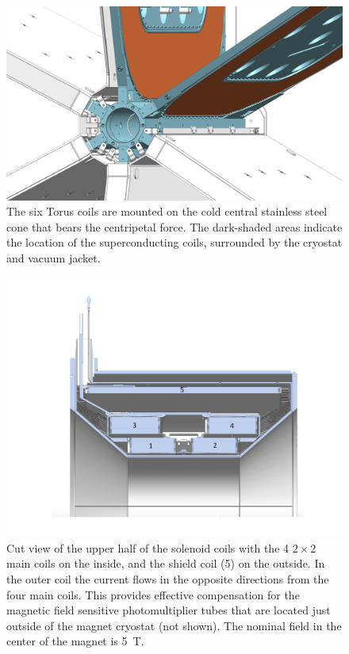 \documentclass[final,3p,twocolumn]{elsarticle}
\begin{document}
\begin{figure}[htbp!]
\centerline{\includegraphics[width=1.00\columnwidth]{torus-hub-2.png}}
\caption{The six Torus coils are mounted on the cold central stainless steel cone that bears the centripetal force. The
dark-shaded areas indicate the location of the superconducting coils, surrounded by the cryostat and vacuum jacket.}
\label{coil-mount}
\end{figure}

\begin{figure}[htbp!]
\centerline{\includegraphics[width=1.3\columnwidth]{Solenoid.pdf}}
\caption{Cut view of the upper half of the solenoid coils with the 4 $2 \times 2$ main coils on the inside, and the shield
coil (5) on the outside. In the outer coil the current flows in the opposite directions from the four main coils. This
provides effective compensation for the magnetic field sensitive photomultiplier tubes that are located just outside
of the magnet cryostat (not shown). The nominal field in the center of the magnet is 5~T.}
\label{solenoid-coils}
\end{figure}
\end{document}
